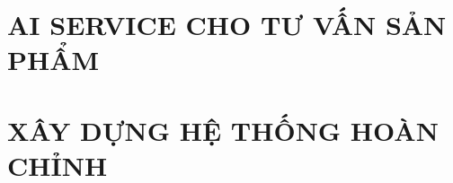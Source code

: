 \documentclass[a4paper,13pt,3p,twoside]{report}
\renewcommand{\headrulewidth}{0pt}
\renewcommand{\footrulewidth}{0pt}}
\theoremstyle{definition}
\begin{document}
\chapter{AI SERVICE CHO TƯ VẤN SẢN PHẨM}
\label{chapter:Methodology}


\newpage
\chapter{XÂY DỰNG HỆ THỐNG HOÀN CHỈNH}
\label{chapter:Experiment}


% 

% 
\end{document}
